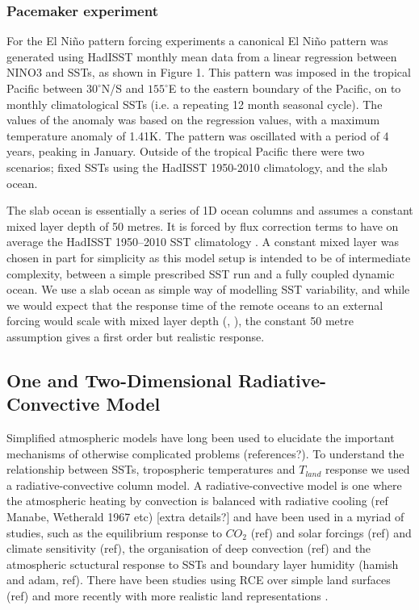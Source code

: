 \subsubsection{Pacemaker experiment}\label{methods:pacemaker}
For the El Ni{\~n}o pattern forcing experiments a canonical El Ni{\~n}o pattern 
was generated using HadISST monthly mean data from a linear regression between 
NINO3 and SSTs, as shown in Figure 1. This pattern was imposed in the tropical 
Pacific between $30^{\circ}$N/S and $155^{\circ}$E to the eastern boundary of 
the Pacific, on to monthly climatological SSTs (i.e. a repeating 12 month 
seasonal cycle).  The values of the anomaly was based on the regression values, 
with a maximum temperature anomaly of 1.41K.  The pattern was oscillated with a 
period of 4 years, peaking in January.  Outside of the tropical Pacific there 
were two scenarios; fixed SSTs using the HadISST 1950-2010 climatology, and the 
slab ocean.  

The slab ocean is essentially a series of 1D ocean columns and assumes a 
constant mixed layer depth of 50 metres. It is forced by flux correction terms 
to have on average the HadISST 1950--2010 SST climatology \citep{Wang2014}. A 
constant mixed layer was chosen in part for simplicity as this model setup is 
intended to be of intermediate complexity, between a simple prescribed SST run 
and a fully coupled dynamic ocean. We use a slab ocean as simple way of 
modelling SST variability, and while we would expect that the response time of 
the remote oceans to an external forcing would scale with mixed layer depth 
(\citealt{Su2005a}, \citealt{Lintner2007}), the constant 50 metre assumption 
gives a first order but realistic response.  


\subsection{One and Two-Dimensional Radiative-Convective Model}
Simplified atmospheric models have long been used to elucidate the important 
mechanisms of otherwise complicated problems (references?). To understand the 
relationship between SSTs, tropospheric temperatures and $T_{land}$ response we 
used a radiative-convective column model. A radiative-convective model is one 
where the atmospheric heating by convection is balanced with radiative cooling 
(ref Manabe, Wetherald 1967 etc) [extra details?] and have been used in a myriad 
of studies, such as the equilibrium response to $CO_2$ (ref) and solar forcings 
(ref) and climate sensitivity (ref), the organisation of deep convection (ref) 
and the atmospheric sctuctural response to SSTs and boundary layer humidity 
(hamish and adam, ref).  There have been studies using RCE over simple land 
surfaces (ref) and more recently with more realistic land representations 
\citep{Rochetin2014}.

